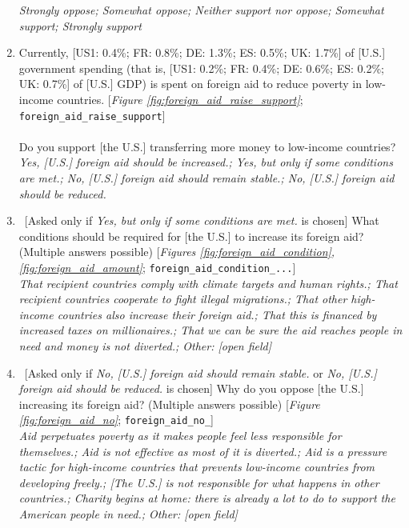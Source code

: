 \begin{enumerate}[resume]
\begin{itemize}
\end{itemize}
\textit{Strongly oppose; Somewhat oppose; Neither support nor oppose; Somewhat support; Strongly support}
\item  \label{q:foreign_aid_raise_support} Currently, [US1: 0.4\%; FR: 0.8\%; DE: 1.3\%; ES: 0.5\%; UK: 1.7\%] of [U.S.] government spending (that is, [US1: 0.2\%; FR: 0.4\%; DE: 0.6\%; ES: 0.2\%; UK: 0.7\%] of [U.S.] GDP) is spent on foreign aid to reduce poverty in low-income countries. [\textit{Figure \ref{fig:foreign_aid_raise_support}}; \verb|foreign_aid_raise_support|]\\
\\
Do you support [the U.S.] transferring more money to low-income countries?
\\ \textit{Yes, [U.S.] foreign aid should be increased.; Yes, but only if some conditions are met.; No, [U.S.] foreign aid should remain stable.; No, [U.S.] foreign aid should be reduced.}
\item  ~[Asked only if \textit{Yes, but only if some conditions are met.} is chosen] \label{q:foreign_aid_condition} What conditions should be required for [the U.S.] to increase its foreign aid? (Multiple answers possible) [\textit{Figures \ref{fig:foreign_aid_condition}, \ref{fig:foreign_aid_amount}}; \verb|foreign_aid_condition_...|]
\\ \textit{That recipient countries comply with climate targets and human rights.; That recipient countries cooperate to fight illegal migrations.; That other high-income countries also increase their foreign aid.; That this is financed by increased taxes on millionaires.; That we can be sure the aid reaches people in need and money is not diverted.; Other: [open field]}
\item  ~[Asked only if \textit{No, [U.S.] foreign aid should remain stable.} or \textit{No, [U.S.] foreign aid should be reduced.} is chosen] \label{q:foreign_aid_no} Why do you oppose [the U.S.] increasing its foreign aid? (Multiple answers possible) [\textit{Figure \ref{fig:foreign_aid_no}}; \verb|foreign_aid_no_|]
\\ \textit{Aid perpetuates poverty as it makes people feel less responsible for themselves.; Aid is not effective as most of it is diverted.; Aid is a pressure tactic for high-income countries that prevents low-income countries from developing freely.; [The U.S.] is not responsible for what happens in other countries.; Charity begins at home: there is already a lot to do to support the American people in need.; Other: [open field]}
\end{enumerate}

